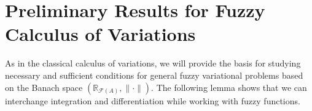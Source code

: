 \documentclass[12pt,a4paper]{article}
\newcommand{\RR}{\mathbb{R}}
\newcommand{\RFA}{\mathbb{R}_{\mathcal{F}(A)}}
\newtheorem{lemma}{Lemma}
\begin{document}
%

\section{Preliminary Results for Fuzzy Calculus of Variations}\label{Preliminary1}
\noindent

As in the classical calculus of variations, we will provide the basis for studying necessary and
sufficient conditions for general fuzzy variational problems based on the Banach space 
$\left(\RFA, \|\cdot\|\right).$
The following lemma shows that we can interchange integration and differentiation while working with
 fuzzy functions.
\end{document}
